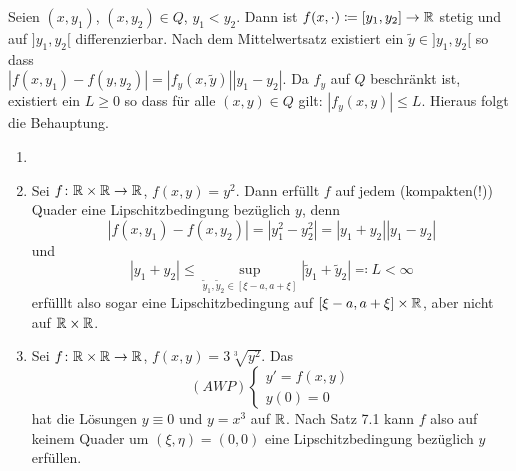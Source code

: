 \begin{beweis}
	Seien $ (x,y_1) $, $ (x,y_2)\in Q $, $ y_1<y_2 $. Dann ist $ f(x,\cdot)\coloneq[y_1,y_2]\rightarrow\mathbb{R} $ stetig und auf $ ]y_1,y_2[ $ differenzierbar. Nach dem Mittelwertsatz existiert ein $ \tilde y\in]y_1,y_2[ $ so dass\\$ |f(x,y_1)-f(y,y_2)|=|f_y(x,\tilde y)||y_1-y_2| $. Da $ f_y $ auf $ Q $ beschr\"ankt ist, existiert ein $ L\geq 0 $ so dass f\"ur alle $ (x,y)\in Q $ gilt: $ |f_y(x,y)|\leq L $. Hieraus folgt die Behauptung.
\end{beweis}
\begin{beispiel}
	\begin{enumerate}
		\item[]
		\item Sei $ f\colon\mathbb{R}\times\mathbb{R}\rightarrow\mathbb{R} $, $ f(x,y)=y^2 $. Dann erf\"ullt $ f $ auf jedem (kompakten(!)) Quader eine Lipschitzbedingung bez\"uglich $ y $, denn
		\[ |f(x,y_1)-f(x,y_2)|=|y_1^2-y_2^2|=|y_1+y_2||y_1-y_2| \]
		und
		\[ |y_1+y_2|\leq\sup_{\tilde y_1,\tilde y_2\in[\xi-a,a+\xi]}|\tilde y_1+\tilde y_2|\eqqcolon L<\infty \]
		erf\"ulllt also sogar eine Lipschitzbedingung auf $ [\xi-a,a+\xi]\times\mathbb{R} $, aber nicht auf $ \mathbb{R}\times\mathbb{R} $.
		\item Sei $ f\colon\mathbb{R}\times\mathbb{R}\rightarrow\mathbb{R} $, $ f(x,y)=3\sqrt[3]{y^2} $. Das
		\[ (AWP)\begin{cases}
		y'=f(x,y)\\y(0)=0
		\end{cases} \]
		hat die L\"osungen $ y\equiv 0 $ und $ y=x^3 $ auf $ \mathbb{R} $. Nach Satz 7.1 kann $ f $ also auf keinem Quader um $ (\xi,\eta)=(0,0) $ eine Lipschitzbedingung bez\"uglich $ y $ erf\"ullen.
 	\end{enumerate}
\end{beispiel}
